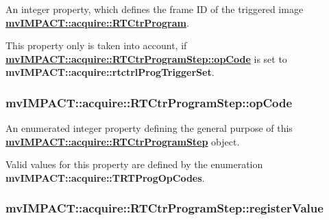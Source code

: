 An integer property, which defines the frame I\+D of the triggered image {\bfseries \hyperlink{classmv_i_m_p_a_c_t_1_1acquire_1_1_r_t_ctr_program}{mv\+I\+M\+P\+A\+C\+T\+::acquire\+::\+R\+T\+Ctr\+Program}}. 

This property only is taken into account, if {\bfseries \hyperlink{classmv_i_m_p_a_c_t_1_1acquire_1_1_r_t_ctr_program_step_a823c9cad26ad628155d68130ad1d6d5d}{mv\+I\+M\+P\+A\+C\+T\+::acquire\+::\+R\+T\+Ctr\+Program\+Step\+::op\+Code}} is set to {\bfseries mv\+I\+M\+P\+A\+C\+T\+::acquire\+::rtctrl\+Prog\+Trigger\+Set}. \hypertarget{classmv_i_m_p_a_c_t_1_1acquire_1_1_r_t_ctr_program_step_a823c9cad26ad628155d68130ad1d6d5d}{
\subsubsection[{op\+Code}]{ mv\+I\+M\+P\+A\+C\+T\+::acquire\+::\+R\+T\+Ctr\+Program\+Step\+::op\+Code}}\label{classmv_i_m_p_a_c_t_1_1acquire_1_1_r_t_ctr_program_step_a823c9cad26ad628155d68130ad1d6d5d}


An enumerated integer property defining the general purpose of this {\bfseries \hyperlink{classmv_i_m_p_a_c_t_1_1acquire_1_1_r_t_ctr_program_step}{mv\+I\+M\+P\+A\+C\+T\+::acquire\+::\+R\+T\+Ctr\+Program\+Step}} object. 

Valid values for this property are defined by the enumeration {\bfseries mv\+I\+M\+P\+A\+C\+T\+::acquire\+::\+T\+R\+T\+Prog\+Op\+Codes}. \hypertarget{classmv_i_m_p_a_c_t_1_1acquire_1_1_r_t_ctr_program_step_aa4a8088b0cb951026c8a290b82bc6657}{
\subsubsection[{register\+Value}]{ mv\+I\+M\+P\+A\+C\+T\+::acquire\+::\+R\+T\+Ctr\+Program\+Step\+::register\+Value}}\label{classmv_i_m_p_a_c_t_1_1acquire_1_1_r_t_ctr_program_step_aa4a8088b0cb951026c8a290b82bc6657}


